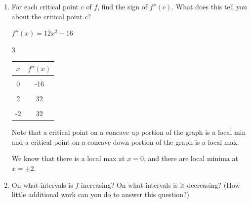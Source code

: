 \documentclass{article}
\begin{document}
\begin{enumerate}[resume]
\begin{enumerate}
  \item
    \begin{problem}[\vfill]
      For each critical point $c$ of $f$, find the sign of $f''(c)$.
      What does this tell you about the critical point $c$?
    \end{problem}

    \begin{solution} 
       $f''(x) = 12x^2-16$
      \begin{multicols}{3}    
          \begin{tabular} {c | c} 
            $x$ & $f''(x)$ \\ 
            \hline \\
            0 & -16\\
            & \\
            2 & 32\\ 
            & \\ 
            -2 & 32 
          \end{tabular} 

          Note that a critical point on a concave up portion of the graph is a local min and a critical point on a concave down portion of the graph is a local max.  

        \vspace{ .2 in } 

        \hfill {} 
      \end{multicols} 

      We know that there is a local max at $x=0$, and there are local minima at $x=\pm 2$.

    \end{solution}

  \item
    \begin{problem}[\stretch{0.2}]
      On what intervals is $f$ increasing?  On what intervals is it
      decreasing?  (How little additional work can you do to answer this
      question?) 
    \end{problem}


\end{enumerate}
\end{enumerate}
\end{document}

